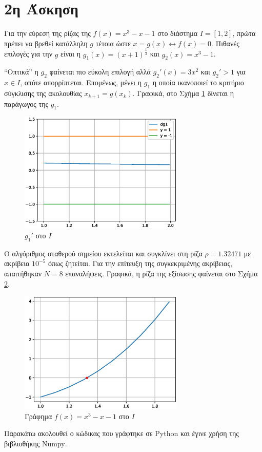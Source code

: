 \documentclass[assignment2.tex]{subfiles}
\begin{document}
\section*{2η Άσκηση}
Για την εύρεση της ρίζας της $f(x)=x^3-x-1$ στο διάστημα $Ι=[1,2]$, πρώτα πρέπει να βρεθεί κατάλληλη $g$ τέτοια ώστε $x=g(x) \leftrightarrow f(x)=0$. Πιθανές επιλογές για την $g$ είναι η $g_1(x)=\left(x+1\right)^{\frac{1}{3}}$ και $g_2(x)=x^3-1$. 

``Οπτικά'' η $g_2$ φαίνεται πιο εύκολη επιλογή αλλά $g_2'(x) = 3x^2$ και $g_2'>1$ για $x\in I$, οπότε απορρίπτεται. Επομένως, μένει η $g_1$ η οποία ικανοποιεί το κριτήριο σύγκλισης της ακολουθίας $x_{k+1}=g(x_k)$. Γραφικά, στο Σχήμα \ref{fig:dg2} δίνεται η παράγωγος της $g_1$.
\begin{figure}[hp]
	\includegraphics[width=0.7\textwidth]{dg2.eps}
	\centering
	\caption{$g_1'$ στο $I$}
	\label{fig:dg2}
\end{figure} 

Ο αλγόριθμος σταθερού σημείου εκτελείται και συγκλίνει στη ρίζα $\rho=1.32471$ με ακρίβεια $10^{-5}$ όπως ζητείται. Για την επίτευξη της συγκεκριμένης ακρίβειας, απαιτήθηκαν $N=8$ επαναλήψεις. Γραφικά, η ρίζα της εξίσωσης φαίνεται στο Σχήμα \ref{fig:f2}.
\begin{figure}[hp]
	\includegraphics[width=0.7\textwidth]{f2.eps}
	\centering
	\caption{Γράφημα $f(x)=x^3-x-1$ στο $I$}
	\label{fig:f2}
\end{figure}

Παρακάτω ακολουθεί ο κώδικας που γράφτηκε σε \textlatin{Python} και έγινε χρήση της βιβλιοθήκης \textlatin{Numpy}.

\end{document}
